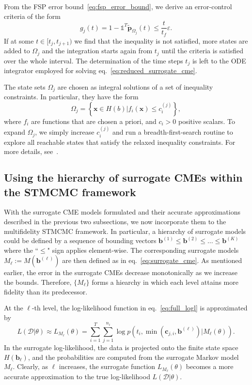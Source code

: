 \documentclass[1p]{article}
\newcommand{\tf}{t_{f}}
\begin{document}
From the FSP error bound~\eqref{eq:fsp_error_bound}, we derive an error-control criteria of the form
\begin{equation}
  g_j(t) = 1 - \mathds{1}^T\widetilde{\bm{p}}_{\Omega_j}(t)
  \leq
  \frac{t}{\tf}\varepsilon.
\end{equation}
If at some $t \in [t_j, t_{j+1})$ we find that the inequality is not satisfied, more states are added to $\Omega_j$ and the integration starts again from $t_j$ until the criteria is satisfied over the whole interval. The determination of the time steps $t_{j}$ is left to the ODE integrator employed for solving eq.~\eqref{eq:reduced_surrogate_cme}.

The state sets $\Omega_j$ are chosen as integral solutions of a set of inequality constraints. In particular, they have the form
\begin{equation}
  \label{eq:constrained_stateset}
  \Omega_j
  =
  \left\{
  \bm{x} \in H(b)
  \vert
  f_i(\bm{x}) \leq c_i^{(j)}
  \right\},
\end{equation}
where $f_i$ are functions that are chosen a priori, and $c_i>0$ positive scalars. To expand $\Omega_j$, we simply increase $c_i^{(j)}$ and run a breadth-first-search routine to explore all reachable states that satisfy the relaxed inequality constraints. For more details, see~\cite{Vo2019parallel}.
\subsection{Using the hierarchy of surrogate CMEs within the STMCMC framework}
With the surrogate CME models formulated and their accurate approximations described in the previous two subsections, we now incorporate them to the multifidelity STMCMC framework.
In particular, a hierarchy of surrogate models could be defined by a sequence of bounding vectors $\bm{b}^{(1)} \leq \bm{b}^{(2)} \leq \ldots \leq \bm{b}^{(K)}$ where the ``$\leq$" sign applies element-wise. The corresponding surrogate models $M_{\ell} := M(\bm{b}^{(\ell)})$ are then defined as in eq.~\eqref{eq:surrogate_cme}.
As mentioned earlier, the error in the surrogate CMEs decrease monotonically as we increase the bounds. Therefore, $\{M_{\ell}\}$ forms a hiearchy in which each level attains more fidelity than its predecessor.

At the $\ell$-th level, the log-likelihood function in eq.~\eqref{eq:full_logl} is approximated by
\begin{equation}
  L(\mathcal{D} \vert \theta)
  \approx
  L_{M_\ell}(\theta)
  =
  \sum_{i=1}^{T}
  {
    \sum_{j=1}^{n_i}
    {
      \log
      p(
        t_i, \min(\bm{c}_{j,i}, \bm{b}^{(\ell)})
        \vert
        M_{\ell}(\theta)
      )
    }
  }
  .
\end{equation}
In the surrogate log-likelihood, the data is projected onto the finite state space $H(\bm{b}_{\ell})$, and the probabilities are computed from the surrogate Markov model $M_{\ell}$. Clearly, as $\ell$ increases, the surrogate function $L_{M_{\ell}}(\theta)$ becomes a more accurate approximation to the true log-likelihood $L(\mathcal{D}\vert \theta)$.
\end{document}
